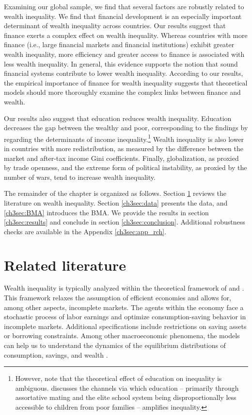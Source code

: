 \begin{refsection}
Examining our global sample, we find that several factors are robustly related to wealth inequality. We find that financial development is an especially important determinant of wealth inequality across countries. Our results suggest that finance exerts a complex effect on wealth inequality. Whereas countries with more finance (i.e., large financial markets and financial institutions) exhibit greater wealth inequality, more efficiency and greater access to finance is associated with less wealth inequality. In general, this evidence supports the notion that sound financial systems contribute to lower wealth inequality. According to our results, the empirical importance of finance for wealth inequality suggests that theoretical models should more thoroughly examine the complex links between finance and wealth.

Our results also suggest that education reduces wealth inequality. Education decreases the gap between the wealthy and poor, corresponding to the findings by \textcite{dabla2015causes} regarding the determinants of income inequality.\footnote{However, note that the theoretical effect of education on inequality is ambiguous. \textcite{scheidel} discusses the channels via which education -- primarily through assortative mating and the elite school system being disproportionally less accessible to children from poor families -- amplifies inequality.} Wealth inequality is also lower in countries with more redistribution, as measured by the difference between the market and after-tax income Gini coefficients. Finally, globalization, as proxied by trade openness, and the extreme form of political instability, as proxied by the number of wars, tend to increase wealth inequality. 

The remainder of the chapter is organized as follows. Section \ref{ch3sec:literature} reviews the literature on wealth inequality. Section \ref{ch3sec:data} presents the data, and \ref{ch3sec:BMA} introduces the \ac{BMA}. We provide the results in section \ref{ch3sec:results} and conclude in section \ref{ch3sec:conclusion}. Additional robustness checks are available in the Appendix \ref{ch3sec:app_rch}.
%
%
%
%
%
\section{Related literature}\label{ch3sec:literature}
Wealth inequality is typically analyzed within the theoretical framework of \textcite{bewley1977permanent} and \textcite{Ayiagari1994}. This framework relaxes the assumption of efficient economies and allows for, among other aspects, incomplete markets. The agents within the economy face a stochastic process of labor earnings and optimize consumption-saving behavior in incomplete markets. Additional specifications include restrictions on saving assets or borrowing constraints. Among other macroeconomic phenomena, the models can help us to understand the dynamics of the equilibrium distributions of consumption, savings, and wealth \parencite{BENHABIB2015489}.


\end{refsection}
